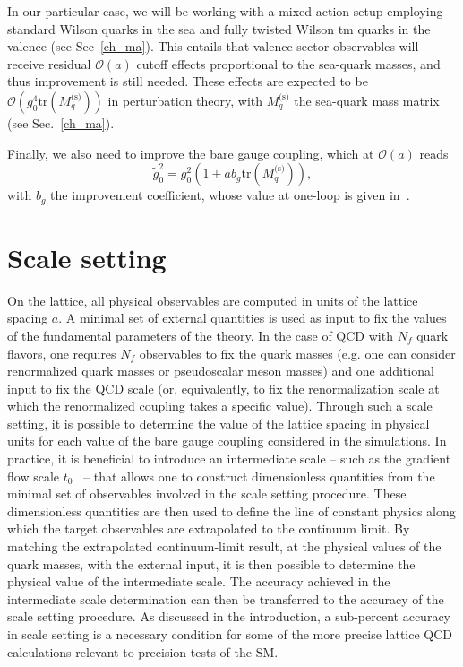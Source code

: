 In our particular case, we will be working with a mixed action setup employing standard Wilson quarks in the sea and fully twisted Wilson tm quarks in the valence (see Sec~\ref{ch_ma}). This entails that valence-sector observables will receive residual $\mathcal{O}(a)$ cutoff effects proportional to the sea-quark masses, and thus improvement is still needed. These effects are expected to be $\mathcal{O}\left(g_0^4{\textrm{tr}}\left(M_q^{\textrm{(s)}}\right)\right)$ in perturbation theory, with $M_q^{\textrm{(s)}}$ the sea-quark mass matrix (see Sec.~\ref{ch_ma}).

Finally, we also need to improve the bare gauge coupling, which at $\mathcal{O}(a)$ reads
\begin{equation}
\tilde{g}_0^2=g_0^2\left(1+ab_g{\textrm{tr}}\left(M_q^{\textrm{(s)}}\right)\right),
\end{equation}
with $b_g$ the improvement coefficient, whose value at one-loop is given in~\citep{Luscher:1996sc}.


\section{Scale setting}
\label{ch_foundation:sec:ss}

On the lattice, all physical observables are computed in units of the lattice spacing $a$. A minimal set of external quantities is used as input to fix the values of the fundamental parameters of the theory. In the case of QCD with $N_f$ quark flavors, one requires $N_f$ observables to fix the quark masses (e.g. one can consider renormalized quark masses or pseudoscalar meson masses) and one additional input to fix the QCD scale (or, equivalently, to fix the renormalization scale at which the renormalized coupling takes a specific value). Through such a scale setting, it is possible to determine the value of the lattice spacing in physical units for each value of the bare gauge coupling considered in the simulations. In practice, it is beneficial to introduce an intermediate scale -- such as the gradient flow scale $t_0$~\citep{Luscher:2010we,1006.4518} -- that allows one to construct dimensionless quantities from the minimal set of observables involved in the scale setting procedure. These dimensionless quantities are then used to define the line of constant physics along which the target observables are extrapolated to the continuum limit. By matching the extrapolated continuum-limit result, at the physical values of the quark masses, with the external input, it is then possible to determine the physical value of the intermediate scale. The accuracy achieved in the intermediate scale determination can then be transferred to the accuracy of the scale setting procedure. As discussed in the introduction, a sub-percent accuracy in scale setting is a necessary condition for some of the more precise lattice QCD calculations relevant to precision tests of the SM. 

